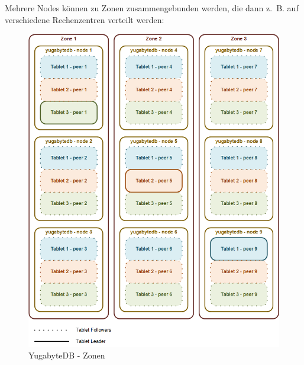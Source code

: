 \begin{flushleft}
    Mehrere Nodes können zu Zonen zusammengebunden werden, die dann z. B. auf verschiedene Rechenzentren verteilt werden:
    \begin{figure}[H]
        \centering
        \includegraphics[width=0.8\linewidth]{source/implementation/evaluation/postgresql_ha_solutions/yugabytedb/yugabytedb-zones}
        \caption{YugabyteDB - Zonen}
        \label{fig:yugabytedb-zones}
    \end{figure}
\end{flushleft}
